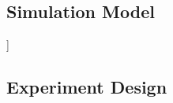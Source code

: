 
\subsection{Simulation Model}
\label{sub:method:model}]



\subsection{Experiment Design}
\label{sub:method:design}
